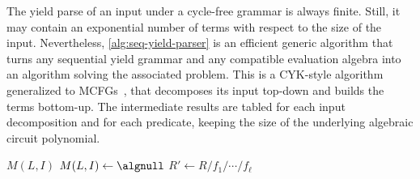 The yield parse of an input under a cycle-free grammar is always finite.
Still, it may contain an exponential number of terms with respect to the size of the input.
Nevertheless, \cref{alg:seq-yield-parser} is an efficient generic algorithm that turns any sequential yield grammar and any compatible evaluation algebra into an algorithm solving the associated problem.
This is a CYK-style algorithm generalized to MCFGs~\parencite[section~7.1]{Kallmeyer2010ParsingBeyondContext}, that decomposes its input top-down and builds the terms bottom-up.
The intermediate results are tabled for each input decomposition and for each predicate, keeping the size of the underlying algebraic circuit polynomial.

\begin{algorithm}
    \capstart
    \begin{algorithmic}[1]
             \Return \(M(L, I)\)
            \EndIf
            \State \(M(L, I) \gets \algnull\)
                    \State \(R' \gets R / f_1 / \cdots / f_\ell\)

\end{algorithmic}
\end{algorithm}
